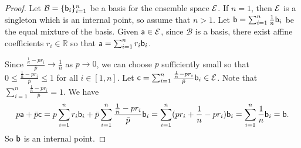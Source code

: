 \begin{proof}
	Let $\mathcal{B} = \{\ens[b]_i\}_{i=1}^n$ be a basis for the ensemble space $\Ens$. If $n = 1$, then $\Ens$ is a singleton which is an internal point, so assume that $n > 1$. Let $\ens[b] = \sum_{i = 1}^n\frac{1}{n}\ens[b]_i$ be the equal mixture of the basis. Given $\ens[a] \in \Ens$, since $\mathcal{B}$ is a basis, there exist affine coefficients $r_i \in \mathbb{R}$ so that $\ens[a] = \sum_{i=1}^nr_i\ens[b]_i$.
	
	\begin{figure}[h]
		\centering
	\end{figure}
	
	Since $\frac{\frac{1}{n} - pr_i}{\bar{p}} \to \frac{1}{n}$ as $p \to 0$, we can choose $p$ sufficiently small so that $0 \le \frac{\frac{1}{n} - pr_i}{\bar{p}} \le 1$ for all $i \in [1,n]$. Let $\ens[c] = \sum_{i=1}^n\frac{\frac{1}{n} - pr_i}{\bar{p}}\ens[b]_i \in \Ens$. Note that $\sum_{i=1}^n\frac{\frac{1}{n} - pr_i}{\bar{p}} = 1$. We have
	\begin{equation}
		p\ens[a] + \bar{p}\ens[c] = p\sum_{i=1}^n r_i\ens[b]_i + \bar{p}\sum_{i=1}^n \frac{\frac{1}{n} - pr_i}{\bar{p}}\ens[b]_i = \sum_{i=1}^n (pr_i + \frac{1}{n} - pr_i) \ens[b]_i = \sum_{i=1}^n\frac{1}{n}\ens[b]_i = \ens[b].
	\end{equation}
	So $\ens[b]$ is an internal point.
\end{proof}

